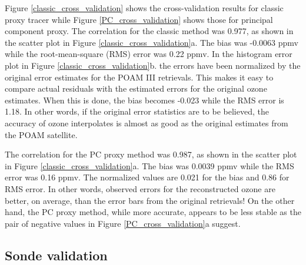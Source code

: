 Figure \ref{classic_cross_validation} shows the cross-validation results
for classic proxy tracer while Figure \ref{PC_cross_validation} shows
those for principal component proxy.
The correlation for the classic method was 0.977, as shown in 
the scatter plot in Figure \ref{classic_cross_validation}a.
The bias was -0.0063 ppmv while the root-mean-square (RMS) error was 0.22 ppmv.
In the histogram error plot in Figure \ref{classic_cross_validation}b.
the errors have been normalized by the original error estimates for the
POAM III retrievals.
This makes it easy to compare actual residuals with the estimated errors
for the original ozone estimates.
When this is done, the bias becomes -0.023 while the RMS error is 1.18.
In other words, if the original error statistics are to be believed, 
the accuracy of ozone interpolates is almost as good as the original estimates
from the POAM satellite.

The correlation for the PC proxy method was 0.987, as shown in 
the scatter plot in Figure \ref{classic_cross_validation}a.
The bias was 0.0039 ppmv while the RMS error was 0.16 ppmv.
The normalized values are 0.021 for the bias and 0.86 for RMS error.
In other words, observed errors for the reconstructed ozone are better,
on average, than the error bars from the original retrievals!
On the other hand, the PC proxy method, while more accurate, appears to be
less stable as the pair of negative values in Figure \ref{PC_cross_validation}a
suggest.

\subsection{Sonde validation}

